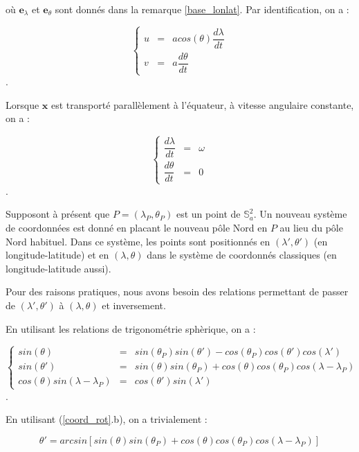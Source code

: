 où $\mathbf{e}_{\lambda}$ et $\mathbf{e}_{\theta}$ sont donnés dans la remarque \ref{base_lonlat}. Par identification, on a :

\begin{equation}
\left\lbrace 
\begin{array}{rcl}
u & = & a cos ( \theta ) \dfrac{d \lambda}{dt} \\
v & = & a \dfrac{d \theta}{dt}
\end{array}
\right.
\end{equation}.

Lorsque $\mathbf{x}$ est transporté parallèlement à l'équateur, à vitesse angulaire constante, on a :

\begin{equation}
\left\lbrace 
\begin{array}{rcl}
\dfrac{d \lambda}{dt} & = & \omega \\
\dfrac{d \theta}{dt} & = & 0
\end{array}
\right.
\end{equation}.

Supposont à présent que $P=( \lambda_P, \theta_P)$ est un point de $\mathbb{S}_a^2$. Un nouveau système de coordonnées est donné en placant le nouveau pôle Nord en $P$ au lieu du pôle Nord habituel. Dans ce système, les points sont positionnés en $(\lambda', \theta')$ (en longitude-latitude) et en $(\lambda, \theta)$ dans le système de coordonnés classiques (en longitude-latitude aussi).

Pour des raisons pratiques, nous avons besoin des relations permettant de passer de $( \lambda', \theta')$ à $(\lambda, \theta)$ et inversement.

En utilisant les relations de trigonométrie sphèrique, on a :

\begin{equation}
\label{coord_rot}
\left\lbrace 
\begin{array}{rcl}
sin ( \theta ) & = & sin( \theta_P) sin( \theta') - cos( \theta_P) cos( \theta') cos( \lambda' ) \\
sin( \theta' ) & = & sin( \theta) sin(\theta_P) + cos( \theta ) cos( \theta_P) cos( \lambda - \lambda_P ) \\
cos( \theta ) sin( \lambda - \lambda_P) & = & cos( \theta' ) sin( \lambda' )
\end{array}
\right.
\end{equation}.

En utilisant (\ref{coord_rot}.b), on a trivialement :

\begin{equation}
\theta' = arcsin \left[ sin( \theta) sin(\theta_P) + cos( \theta ) cos( \theta_P) cos( \lambda - \lambda_P ) \right]
\end{equation}

